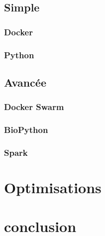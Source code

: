 \subsection{Simple}
\subsubsection{Docker}

\subsubsection{Python}

\subsection{Avancée}
\subsubsection{Docker Swarm}

\subsubsection{BioPython}

\subsubsection{Spark}
	
	
	
\section{Optimisations}



\section{conclusion}
















